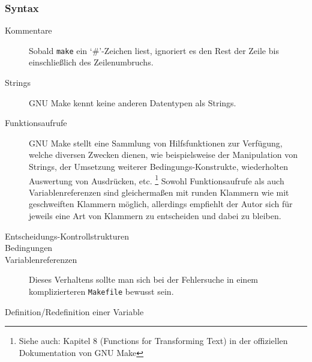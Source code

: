 \subsubsection*{Syntax}

\begin{description}
	\item[Kommentare] \hspace{\fill} 
		
		Sobald \texttt{make} ein `\#'-Zeichen liest, ignoriert es den Rest der
		Zeile bis einschließlich des Zeilenumbruchs.
	\item[Strings] \hspace{\fill} 

		GNU Make kennt keine anderen Datentypen als Strings.
	\item[Funktionsaufrufe] \hspace{\fill} 
		
		GNU Make stellt eine Sammlung von Hilfsfunktionen zur Verfügung, welche
		diversen Zwecken dienen, wie beispielsweise der Manipulation von
		Strings, der Umsetzung weiterer Bedingungs-Konstrukte, wiederholten
		Auswertung von Ausdrücken, etc.  \footnote{Siehe auch: Kapitel 8 (Functions
		for Transforming Text) in der offiziellen Dokumentation von GNU Make
		}
		Sowohl Funktionsaufrufe als auch Variablenreferenzen sind gleichermaßen
		mit runden Klammern wie mit geschweiften Klammern möglich, allerdings
		empfiehlt der Autor sich für jeweils eine Art von Klammern zu
		entscheiden und dabei zu bleiben.
	\item[Entscheidungs-Kontrollstrukturen]	\hspace{\fill}
	
	\item[Bedingungen] \hspace{\fill} 
	\item[Variablenreferenzen] \hspace{\fill} 

		
		Dieses Verhaltens sollte man sich bei der Fehlersuche in einem
		komplizierteren \texttt{Makefile} bewusst sein.
	\item[Definition/Redefinition einer Variable] \hspace{\fill}
	


\end{description}
